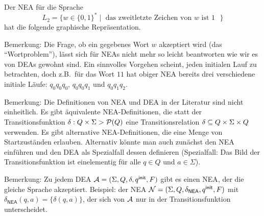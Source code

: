\begin{Bsp}
\label{bsp:2.zweitletztes} Der \acs*{NEA} für die Sprache 
$$L_2=\{w\in\{0,1\}^*\mid \text{ das zweitletzte Zeichen von $w$ ist $1$ }\}$$ hat die folgende graphische Repräsentation.
  \begin{center}
  \end{center}
\end{Bsp}


Bemerkung: Die Frage, ob ein gegebenes Wort $w$ akzeptiert wird (das "`Wortproblem"'), lässt sich für \acs*{NEA}s nicht mehr so leicht beantworten wie wir es von \acs*{DEA}s gewohnt sind.
Ein sinnvolles Vorgehen scheint, jeden initialen Lauf zu betrachten, doch z.B.\ für das Wort $11$ hat obiger \acs*{NEA} bereits  drei verschiedene initiale Läufe: $q_0q_0q_0$, $q_0q_0q_1$ und $q_0q_1q_2$.


Bemerkung: Die Definitionen von \ac{NEA} und \ac{DEA} in der Literatur sind nicht einheitlich. 
Es gibt äquivalente \ac{NEA}-Definitionen, die statt der Transitionsfunktion $\delta:Q\times\Sigma\->\mathcal{P}(Q)$ eine Transitionsrelation $\delta\subseteq Q\times\Sigma\times Q$ verwenden.
Es gibt alternative \ac{NEA}-Definitionen, die eine Menge von Startzuständen erlauben.
Alternativ könnte man auch zunächst den \ac{NEA} einführen und den \ac{DEA} als Spezialfall dessen definieren (Spezialfall: Das Bild der Transitionsfunktion ist einelementig für alle $q\in Q$ und $a\in\Sigma$).

Bemerkung: Zu jedem \ac{DEA} $\mathcal{A}= (\Sigma, Q,\delta,q^\mathsf{init},F)$ gibt es einen \ac{NEA}, der die gleiche Sprache akzeptiert.
Beispiel: der \ac{NEA} $\mathcal{N}= (\Sigma, Q,\delta_\mathsf{NEA},q^\mathsf{init},F)$ mit $\delta_\mathsf{NEA}(q,a)=\{\delta(q,a)\}$, der sich von $\mathcal{A}$ nur in der Transitionsfunktion unterscheidet.


